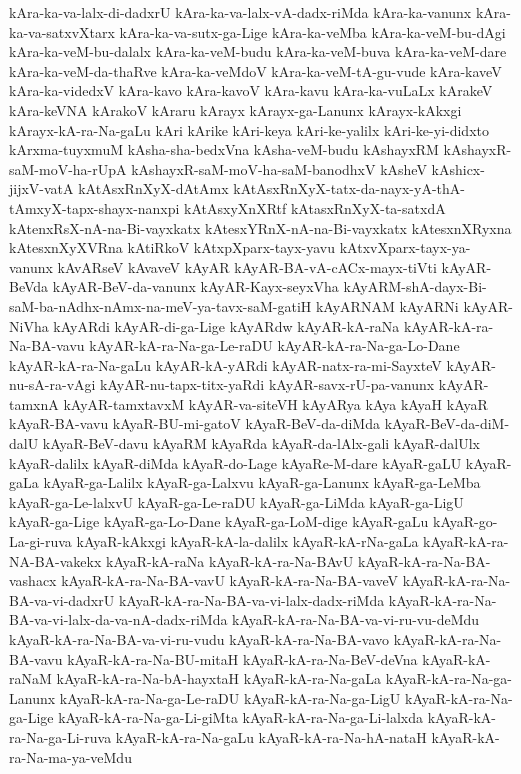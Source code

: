 {kAra-ka-va-lalx-di-dadxrU
kAra-ka-va-lalx-vA-dadx-riMda
kAra-ka-vanunx
kAra-ka-va-satxvXtarx
kAra-ka-va-sutx-ga-Lige
kAra-ka-veMba
kAra-ka-veM-bu-dAgi
kAra-ka-veM-bu-dalalx
kAra-ka-veM-budu
kAra-ka-veM-buva
kAra-ka-veM-dare
kAra-ka-veM-da-thaRve
kAra-ka-veMdoV
kAra-ka-veM-tA-gu-vude
kAra-kaveV
kAra-ka-videdxV
kAra-kavo
kAra-kavoV
kAra-kavu
kAra-ka-vuLaLx
kArakeV
kAra-keVNA
kArakoV
kAraru
kArayx
kArayx-ga-Lanunx
kArayx-kAkxgi
kArayx-kA-ra-Na-gaLu
kAri
kArike
kAri-keya
kAri-ke-yalilx
kAri-ke-yi-didxto
kArxma-tuyxmuM
kAsha-sha-bedxVna
kAsha-veM-budu
kAshayxRM
kAshayxR-saM-moV-ha-rUpA
kAshayxR-saM-moV-ha-saM-banodhxV
kAsheV
kAshicx-jijxV-vatA
kAtAsxRnXyX-dAtAmx
kAtAsxRnXyX-tatx-da-nayx-yA-thA-tAmxyX-tapx-shayx-nanxpi
kAtAsxyXnXRtf
kAtasxRnXyX-ta-satxdA
kAtenxRsX-nA-na-Bi-vayxkatx
kAtesxYRnX-nA-na-Bi-vayxkatx
kAtesxnXRyxna
kAtesxnXyXVRna
kAtiRkoV
kAtxpXparx-tayx-yavu
kAtxvXparx-tayx-ya-vanunx
kAvARseV
kAvaveV
kAyAR
kAyAR-BA-vA-cACx-mayx-tiVti
kAyAR-BeVda
kAyAR-BeV-da-vanunx
kAyAR-Kayx-seyxVha
kAyARM-shA-dayx-Bi-saM-ba-nAdhx-nAmx-na-meV-ya-tavx-saM-gatiH
kAyARNAM
kAyARNi
kAyAR-NiVha
kAyARdi
kAyAR-di-ga-Lige
kAyARdw
kAyAR-kA-raNa
kAyAR-kA-ra-Na-BA-vavu
kAyAR-kA-ra-Na-ga-Le-raDU
kAyAR-kA-ra-Na-ga-Lo-Dane
kAyAR-kA-ra-Na-gaLu
kAyAR-kA-yARdi
kAyAR-natx-ra-mi-SayxteV
kAyAR-nu-sA-ra-vAgi
kAyAR-nu-tapx-titx-yaRdi
kAyAR-savx-rU-pa-vanunx
kAyAR-tamxnA
kAyAR-tamxtavxM
kAyAR-va-siteVH
kAyARya
kAya
kAyaH
kAyaR
kAyaR-BA-vavu
kAyaR-BU-mi-gatoV
kAyaR-BeV-da-diMda
kAyaR-BeV-da-diM-dalU
kAyaR-BeV-davu
kAyaRM
kAyaRda
kAyaR-da-lAlx-gali
kAyaR-dalUlx
kAyaR-dalilx
kAyaR-diMda
kAyaR-do-Lage
kAyaRe-M-dare
kAyaR-gaLU
kAyaR-gaLa
kAyaR-ga-Lalilx
kAyaR-ga-Lalxvu
kAyaR-ga-Lanunx
kAyaR-ga-LeMba
kAyaR-ga-Le-lalxvU
kAyaR-ga-Le-raDU
kAyaR-ga-LiMda
kAyaR-ga-LigU
kAyaR-ga-Lige
kAyaR-ga-Lo-Dane
kAyaR-ga-LoM-dige
kAyaR-gaLu
kAyaR-go-La-gi-ruva
kAyaR-kAkxgi
kAyaR-kA-la-dalilx
kAyaR-kA-rNa-gaLa
kAyaR-kA-ra-NA-BA-vakekx
kAyaR-kA-raNa
kAyaR-kA-ra-Na-BAvU
kAyaR-kA-ra-Na-BA-vashacx
kAyaR-kA-ra-Na-BA-vavU
kAyaR-kA-ra-Na-BA-vaveV
kAyaR-kA-ra-Na-BA-va-vi-dadxrU
kAyaR-kA-ra-Na-BA-va-vi-lalx-dadx-riMda
kAyaR-kA-ra-Na-BA-va-vi-lalx-da-va-nA-dadx-riMda
kAyaR-kA-ra-Na-BA-va-vi-ru-vu-deMdu
kAyaR-kA-ra-Na-BA-va-vi-ru-vudu
kAyaR-kA-ra-Na-BA-vavo
kAyaR-kA-ra-Na-BA-vavu
kAyaR-kA-ra-Na-BU-mitaH
kAyaR-kA-ra-Na-BeV-deVna
kAyaR-kA-raNaM
kAyaR-kA-ra-Na-bA-hayxtaH
kAyaR-kA-ra-Na-gaLa
kAyaR-kA-ra-Na-ga-Lanunx
kAyaR-kA-ra-Na-ga-Le-raDU
kAyaR-kA-ra-Na-ga-LigU
kAyaR-kA-ra-Na-ga-Lige
kAyaR-kA-ra-Na-ga-Li-giMta
kAyaR-kA-ra-Na-ga-Li-lalxda
kAyaR-kA-ra-Na-ga-Li-ruva
kAyaR-kA-ra-Na-gaLu
kAyaR-kA-ra-Na-hA-nataH
kAyaR-kA-ra-Na-ma-ya-veMdu
}

